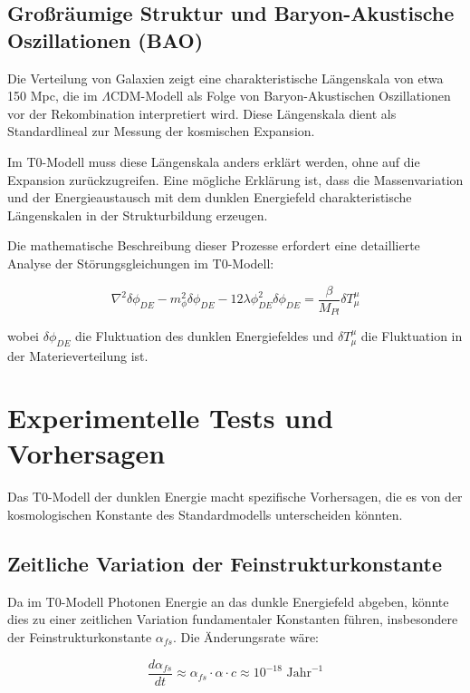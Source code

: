 \documentclass[a4paper,12pt]{article}
\theoremstyle{definition}
\theoremstyle{remark}
\begin{document}
	\subsection{Großräumige Struktur und Baryon-Akustische Oszillationen (BAO)}
	Die Verteilung von Galaxien zeigt eine charakteristische Längenskala von etwa 150 Mpc, die im $\Lambda$CDM-Modell als Folge von Baryon-Akustischen Oszillationen vor der Rekombination interpretiert wird. Diese Längenskala dient als Standardlineal zur Messung der kosmischen Expansion.
	
	Im T0-Modell muss diese Längenskala anders erklärt werden, ohne auf die Expansion zurückzugreifen. Eine mögliche Erklärung ist, dass die Massenvariation und der Energieaustausch mit dem dunklen Energiefeld charakteristische Längenskalen in der Strukturbildung erzeugen.
	
	Die mathematische Beschreibung dieser Prozesse erfordert eine detaillierte Analyse der Störungsgleichungen im T0-Modell:
	
	\begin{equation}
		\nabla^2 \delta\phi_{DE} - m_{\phi}^2 \delta\phi_{DE} - 12\lambda\phi_{DE}^2 \delta\phi_{DE} = \frac{\beta}{M_{Pl}}\delta T^{\mu}_{\mu}
	\end{equation}
	
	wobei $\delta\phi_{DE}$ die Fluktuation des dunklen Energiefeldes und $\delta T^{\mu}_{\mu}$ die Fluktuation in der Materieverteilung ist.
	
	\section{Experimentelle Tests und Vorhersagen}
	Das T0-Modell der dunklen Energie macht spezifische Vorhersagen, die es von der kosmologischen Konstante des Standardmodells unterscheiden könnten.
	
	\subsection{Zeitliche Variation der Feinstrukturkonstante}
	Da im T0-Modell Photonen Energie an das dunkle Energiefeld abgeben, könnte dies zu einer zeitlichen Variation fundamentaler Konstanten führen, insbesondere der Feinstrukturkonstante $\alpha_{fs}$. Die Änderungsrate wäre:
	
	\begin{equation}
		\frac{d\alpha_{fs}}{dt} \approx \alpha_{fs} \cdot \alpha \cdot c \approx 10^{-18} \text{ Jahr}^{-1}
	\end{equation}
	
\end{document}
